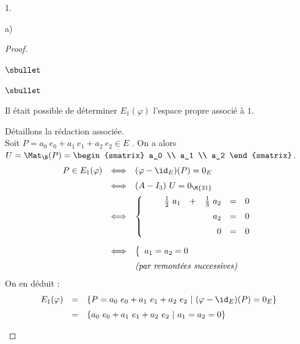 \documentclass[11pt]{article}%
\begin{document}
\begin{noliste}{1.}
\begin{noliste}{a)}
\begin{proof}
\begin{noliste}{$\sbullet$}
        \begin{remark}%
          \begin{noliste}{$\sbullet$}
          \item Il était possible de déterminer $E_1(\varphi)$
            l'espace propre associé à $1$.
          \item Détaillons la rédaction associée.\\
            Soit $P = a_0 \ e_0 + a_1 \ e_1 + a_2 \ e_2 \in E$ . On a
            alors $U = \Mat_{\B}(P) =
            \begin{smatrix}
              a_0 \\
              a_1 \\
              a_2
            \end{smatrix}
            $.
            \[
            \begin{array}{rcl}
              P \in E_1(\varphi) 
              & \Longleftrightarrow & (\varphi - \id_E)(P) = 0_E 
              \\[.2cm]
              & \Longleftrightarrow & (A - I_3) \ U = 0_{\M{31}}
              \\[.2cm]
              & \Longleftrightarrow & 
              \left\{
                \begin{array}{rcrcrcr}
                  & & \frac{1}{2} \ a_1 & + & \frac{1}{3} \ a_2 & = & 0
                  \\[.2cm]
                  & & & & a_2 & = & 0
                  \\[.2cm]
                  & & & & 0 & = & 0
                \end{array}
              \right.
              \\[1cm]
              & \Longleftrightarrow & 
              \left\{
                \begin{array}{l}
                  a_1 = a_2 = 0
                \end{array}
              \right.
              \\[.2cm]
              & & \text{\it (par remontées successives)}
            \end{array}
            \]
            On en déduit :
            \[
            \begin{array}{rcl}
              E_1(\varphi) & = & \{ P = a_0 \ e_0 + a_1 \ e_1 + a_2 \ e_2 \
              | \ (\varphi - \id_E)(P) = 0_E \}
              \\[.2cm]
              & = & \{ a_0 \ e_0 + a_1 \ e_1 + a_2 \ e_2 \
              | \ a_1 = a_2 = 0 \}

\end{array}\]
\end{noliste}
\end{remark}
\end{noliste}
\end{proof}
\end{noliste}
\end{noliste}
\end{document}
